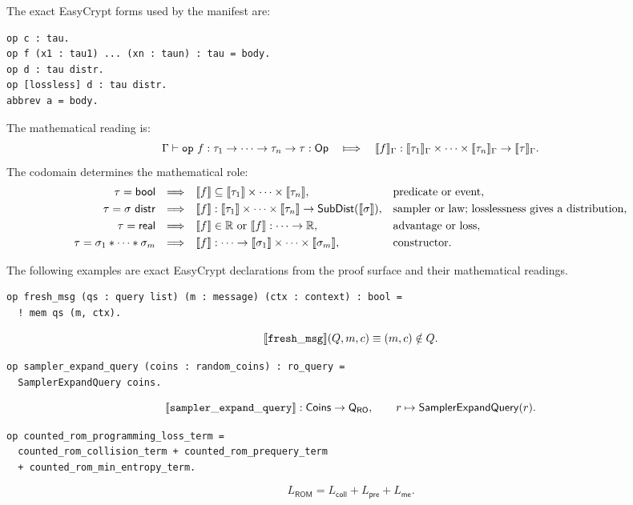 The exact EasyCrypt forms used by the manifest are:

\begin{lstlisting}[language=EasyCrypt]
op c : tau.
op f (x1 : tau1) ... (xn : taun) : tau = body.
op d : tau distr.
op [lossless] d : tau distr.
abbrev a = body.
\end{lstlisting}

The mathematical reading is:
\[
  \Gamma\vdash \mathtt{op}\ f : \tau_1 \to \cdots \to \tau_n \to \tau
  :\mathsf{Op}
  \quad\Longmapsto\quad
  \ECsem{f}_{\Gamma}:
  \ECsem{\tau_1}_{\Gamma}\times\cdots\times\ECsem{\tau_n}_{\Gamma}
  \to \ECsem{\tau}_{\Gamma}.
\]
The codomain determines the mathematical role:
\[
\begin{array}{rcll}
\tau=\mathsf{bool}
&\Longrightarrow&
\llbracket f \rrbracket\subseteq
\llbracket \tau_1 \rrbracket\times\cdots\times\llbracket \tau_n \rrbracket,
& \text{predicate or event},\\[0.3em]
\tau=\sigma\ \mathsf{distr}
&\Longrightarrow&
\llbracket f \rrbracket:
\llbracket \tau_1 \rrbracket\times\cdots\times\llbracket \tau_n \rrbracket
\to \mathsf{SubDist}(\llbracket \sigma \rrbracket),
& \text{sampler or law; losslessness gives a distribution},\\[0.3em]
\tau=\mathsf{real}
&\Longrightarrow&
\llbracket f \rrbracket\in\mathbb{R}
\text{ or }
\llbracket f \rrbracket:\cdots\to\mathbb{R},
& \text{advantage or loss},\\[0.3em]
\tau=\sigma_1*\cdots*\sigma_m
&\Longrightarrow&
\llbracket f \rrbracket:\cdots\to
\llbracket \sigma_1 \rrbracket\times\cdots\times\llbracket \sigma_m \rrbracket,
& \text{constructor}.
\end{array}
\]

The following examples are exact EasyCrypt declarations from the proof surface
and their mathematical readings.

\begin{lstlisting}[language=EasyCrypt]
op fresh_msg (qs : query list) (m : message) (ctx : context) : bool =
  ! mem qs (m, ctx).
\end{lstlisting}
\[
  \llbracket \mathtt{fresh\_msg} \rrbracket(Q,m,c)
  \equiv
  (m,c)\notin Q.
\]

\begin{lstlisting}[language=EasyCrypt]
op sampler_expand_query (coins : random_coins) : ro_query =
  SamplerExpandQuery coins.
\end{lstlisting}
\[
  \llbracket \mathtt{sampler\_expand\_query} \rrbracket:
  \mathsf{Coins}\to\mathsf{Q}_{\mathsf{RO}},
  \qquad
  r\mapsto \mathsf{SamplerExpandQuery}(r).
\]

\begin{lstlisting}[language=EasyCrypt]
op counted_rom_programming_loss_term =
  counted_rom_collision_term + counted_rom_prequery_term
  + counted_rom_min_entropy_term.
\end{lstlisting}
\[
  L_{\mathsf{ROM}}
  =
  L_{\mathsf{coll}}
  +
  L_{\mathsf{pre}}
  +
  L_{\mathsf{me}}.
\]

